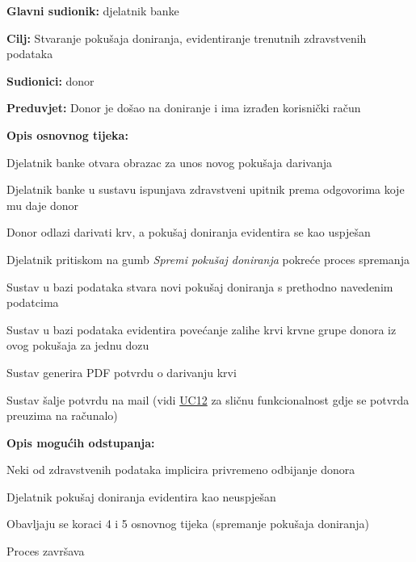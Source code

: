 					
					\noindent {}
					\begin{packed_item} \label{UC6}
	
						\item \textbf{Glavni sudionik: }djelatnik banke
						\item  \textbf{Cilj:} Stvaranje pokušaja doniranja, evidentiranje trenutnih zdravstvenih podataka
						\item  \textbf{Sudionici:} donor
						\item  \textbf{Preduvjet:} Donor je došao na doniranje i ima izrađen korisnički račun 
						\item  \textbf{Opis osnovnog tijeka:}
						
						\item[] \begin{packed_enum}
	
							\item Djelatnik banke otvara obrazac za unos novog pokušaja darivanja
							\item Djelatnik banke u sustavu ispunjava zdravstveni upitnik prema odgovorima koje mu daje donor
	                        \item Donor odlazi darivati krv, a pokušaj doniranja evidentira se kao uspješan
	                        \item Djelatnik pritiskom na gumb \textit{Spremi pokušaj doniranja} pokreće proces spremanja
	                        \item Sustav u bazi podataka stvara novi pokušaj doniranja s prethodno navedenim podatcima
	                        \item Sustav u bazi podataka evidentira povećanje zalihe krvi krvne grupe donora iz ovog pokušaja za jednu dozu
	                        \item Sustav generira PDF potvrdu o darivanju krvi
	                        \item Sustav šalje potvrdu na mail (vidi \hyperref[UC12]{UC12} za sličnu funkcionalnost gdje se potvrda preuzima na računalo)

						\end{packed_enum}
						
						\item  \textbf{Opis mogućih odstupanja:}
						
						\item[] \begin{packed_item}
	
							\item[2.a] Neki od zdravstvenih podataka implicira privremeno odbijanje donora
							\begin{packed_enum}
								\item Djelatnik pokušaj doniranja evidentira kao neuspješan
								\item Obavljaju se koraci 4 i 5 osnovnog tijeka (spremanje pokušaja doniranja)
								\item Proces završava
							\end{packed_enum}
							

\end{packed_item}
\end{packed_item}
